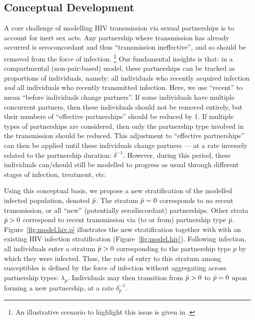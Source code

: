 \subsection{Conceptual Development}\label{foi.prop.concept} %
A core challenge of modelling HIV transmission via sexual partnerships is
to account for inert sex acts.
Any partnership where transmission has already occurred
is seroconcordant and thus ``transmission ineffective'',
and so should be removed from the force of infection.%
\footnote{An illustrative scenario to highlight this issue is given in .}
Our fundamental insights is that:
in a compartmental (non-pair-based) model,
these partnerships can be tracked as proportions of individuals, namely:
all individuals who recently acquired infection \emph{and}
all individuals who recently transmitted infection.
Here, we use ``recent'' to mean ``before individuals change partners''.
If some individuals have multiple concurrent partners,
then these individuals should not be removed entirely,
but their numbers of ``effective partnerships'' should be reduced by 1.
If multiple types of partnerships are considered,
then only the partnership type involved in the transmission should be reduced.
This adjustment to ``effective partnerships'' can then be applied
until these individuals change partners
--- at a rate inversely related to the partnership duration: $\delta^{-1}$.
However, during this period, these individuals can/should still be modelled
to progress as usual through different stages of infection, treatment, etc.
\par
Using this conceptual basis,
we propose a new stratification of the modelled infected population, denoted $\bar{p}$.
The stratum $\bar{p} = 0$ corresponds to no recent transmission,
or all ``new'' (potentially serodiscordant) partnerships.
Other strata $\bar{p} > 0$ correspond to recent transmission via (to or from) partnership type $\bar{p}$.
Figure~\ref{fig:model.hiv.p} illustrates the new stratification
together with with an existing HIV infection stratification (Figure~\ref{fig:model.hiv}).
Following infection, all individuals enter a stratum $\bar{p} > 0$
corresponding to the partnership type $p$ by which they were infected.
Thus, the rate of entry to this stratum among susceptibles is defined by
the force of infection without aggregating across partnership types: $\lambda_{p}$.
Individuals may then transition from $\bar{p} > 0$ to $\bar{p} = 0$
upon forming a new partnership, at a rate $\delta_p^{-1}$.
